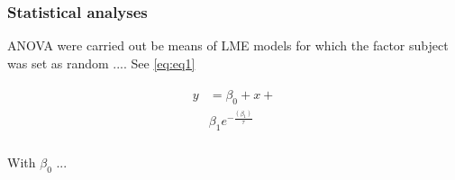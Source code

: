 \lipsum[1-6]


\subsubsection*{Statistical analyses}
\label{subsubsec:statistics}
\Ac{ANOVA} were carried out be means of \ac{LME} models for which the factor subject was set as random ....  
See \autoref{eq:eq1}


\begin{align}
	\begin{split}
	\label{eq:eq1}
	y & = \beta_0 + x + \\
	&  \beta_1 e^{-\frac{\left( \beta_1 \right)}{\tau}} \\
	\end{split}
\end{align}


\noindent With $\beta_0$ ...

